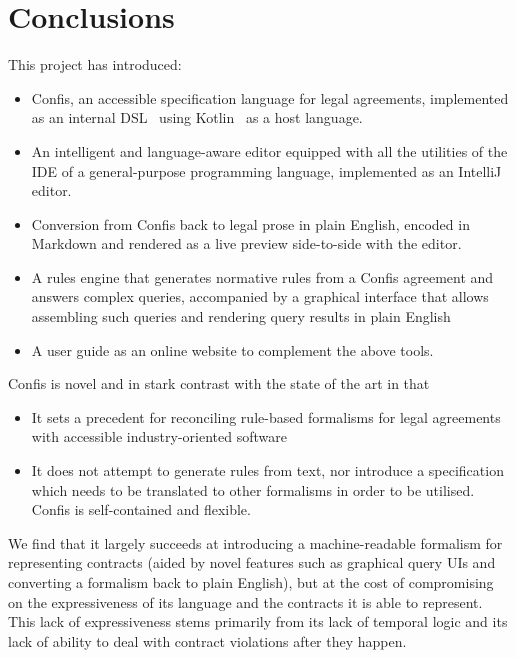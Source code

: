 \chapter{Conclusions}\label{ch:conclusions}

This project has introduced:
\begin{itemize}
    \item Confis, an accessible specification language for legal agreements, implemented as an internal DSL~\cite{fowlerDsl} using Kotlin~\cite{kotlinLang} as a host language.
    \item An intelligent and language-aware editor equipped with all the utilities of the IDE of a general-purpose programming language, implemented as an IntelliJ~\cite{intelliJRepo} editor.
    \item Conversion from Confis back to legal prose in plain English, encoded in Markdown and rendered as a live preview side-to-side with the editor.
    \item A rules engine that generates normative rules from a Confis agreement and answers complex queries, accompanied by a graphical interface that allows assembling such queries and rendering query results in plain English
    \item A user guide as an online website to complement the above tools.
\end{itemize}

Confis is novel and in stark contrast with the state of the art in that
\begin{itemize}
    \item It sets a precedent for reconciling rule-based formalisms for legal agreements with accessible industry-oriented software
    \item It does not attempt to generate rules from text, nor introduce a specification which needs to be translated to other formalisms in order to be utilised.
    Confis is self-contained and flexible.
\end{itemize}

We find that it largely succeeds at introducing a machine-readable formalism for representing contracts (aided by novel features such as graphical query UIs and converting a formalism back to plain English), but at the cost of compromising on the expressiveness of its language and the contracts it is able to represent.
This lack of expressiveness stems primarily from its lack of temporal logic and its lack of ability to deal with contract violations after they happen.

